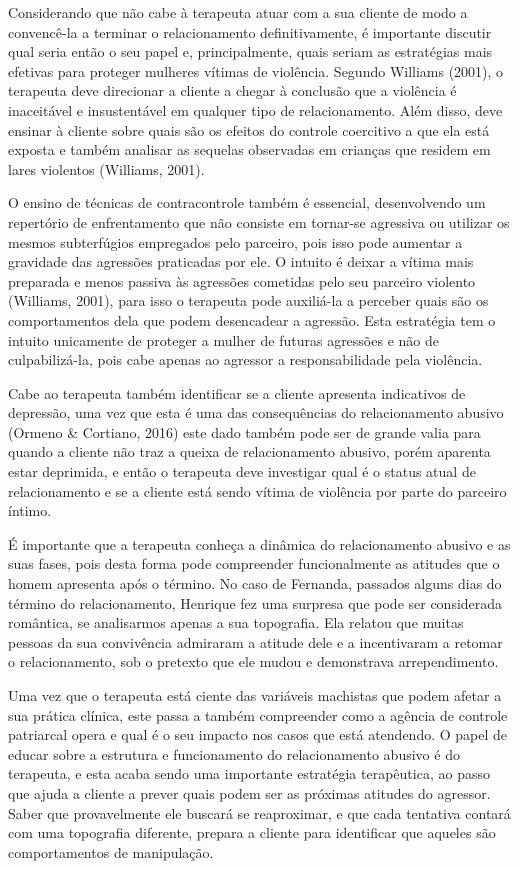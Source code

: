 Considerando que não cabe à terapeuta atuar com a sua cliente de modo a convencê-la a terminar o relacionamento definitivamente, é importante discutir qual seria então o seu papel e, principalmente, quais seriam as estratégias mais efetivas para proteger mulheres vítimas de violência. Segundo Williams (2001), o terapeuta deve direcionar a cliente a chegar à conclusão que a violência é inaceitável e insustentável em qualquer tipo de relacionamento. Além disso, deve ensinar à cliente sobre quais são os efeitos do controle coercitivo a que ela está exposta e também analisar as sequelas observadas em crianças que residem em lares violentos (Williams, 2001).

O ensino de técnicas de contracontrole também é essencial, desenvolvendo um repertório de enfrentamento que não consiste em tornar-se agressiva ou utilizar os mesmos subterfúgios empregados pelo parceiro, pois isso pode aumentar a gravidade das agressões praticadas por ele. O intuito é deixar a vítima mais preparada e menos passiva às agressões cometidas pelo seu parceiro violento (Williams, 2001), para isso o terapeuta pode auxiliá-la a perceber quais são os comportamentos dela que podem desencadear a agressão. Esta estratégia tem o intuito unicamente de proteger a mulher de futuras agressões e não de culpabilizá-la, pois cabe apenas ao agressor a responsabilidade pela violência.

Cabe ao terapeuta também identificar se a cliente apresenta indicativos de depressão, uma vez que esta é uma das consequências do relacionamento abusivo (Ormeno \& Cortiano, 2016) este dado também pode ser de grande valia para quando a cliente não traz a queixa de relacionamento abusivo, porém aparenta estar deprimida, e então o terapeuta deve investigar qual é o status atual de relacionamento e se a cliente está sendo vítima de violência por parte do parceiro íntimo.

É importante que a terapeuta conheça a dinâmica do relacionamento abusivo e as suas fases, pois desta forma pode compreender funcionalmente as atitudes que o homem apresenta após o término. No caso de Fernanda, passados alguns dias do término do relacionamento, Henrique fez uma surpresa que pode ser considerada romântica, se analisarmos apenas a sua topografia. Ela relatou que muitas pessoas da sua convivência admiraram a atitude dele e a incentivaram a retomar o relacionamento, sob o pretexto que ele mudou e demonstrava arrependimento.

Uma vez que o terapeuta está ciente das variáveis machistas que podem afetar a sua prática clínica, este passa a também compreender como a agência de controle patriarcal opera e qual é o seu impacto nos casos que está atendendo. O papel de educar sobre a estrutura e funcionamento do relacionamento abusivo é do terapeuta, e esta acaba sendo uma importante estratégia terapêutica, ao passo que ajuda a cliente a prever quais podem ser as próximas atitudes do agressor. Saber que provavelmente ele buscará se reaproximar, e que cada tentativa contará com uma topografia diferente, prepara a cliente para identificar que aqueles são comportamentos de manipulação.

